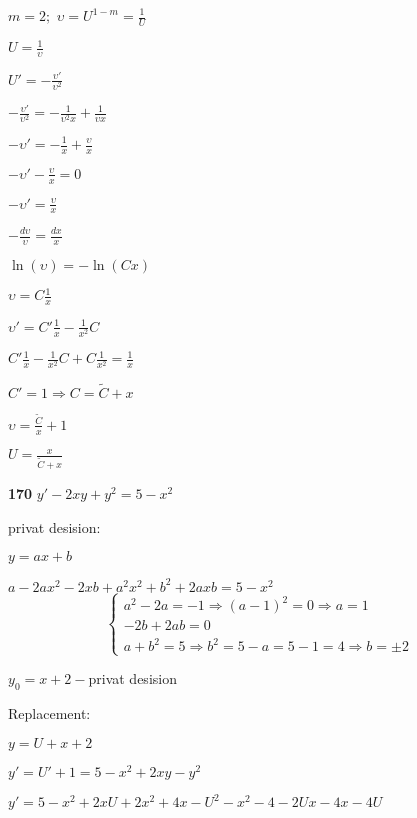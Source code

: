 \documentclass{article}
\begin{document}
\begin{left}
\begin{spacing}{2.2}
$m=2; $ $\displaystyle \upsilon=U^{1-m}=\frac{1}{U}$

$\displaystyle U=\frac{1}{\upsilon}$

$\displaystyle U'=-\frac{\upsilon'}{\upsilon^2}$

$\displaystyle -\frac{\upsilon'}{\upsilon^2}=-\frac{1}{\upsilon^2 x}+\frac{1}{\upsilon x}$

$\displaystyle -\upsilon'=-\frac{1}{x}+\frac{\upsilon}{x}$

$\displaystyle -\upsilon'-\frac{\upsilon}{x}=0$

$\displaystyle -\upsilon'=\frac{\upsilon}{x}$

$\displaystyle -\frac{d\upsilon}{\upsilon}=\frac{dx}{x}$

$\ln(\upsilon)=-\ln(Cx)$

$\displaystyle \upsilon=C\frac{1}{x}$

$\displaystyle \upsilon'=C'\frac{1}{x}-\frac{1}{x^2}C$

$\displaystyle C'\frac{1}{x}-\frac{1}{x^2}C+C\frac{1}{x^2}=\frac{1}{x}$

$C'=1 \Rightarrow C= \widetilde{C}+x$

$\displaystyle \upsilon=\frac{\widetilde{C}}{x}+1$

$\displaystyle U=\frac{x}{\widetilde{C}+x}$

\end{spacing}
\end{left}

\begin{flushleft}
{\bf 170 } $y'-2xy+y^2=5-x^2$


\end{flushleft}
privat desision:
\begin{left}
\begin{spacing}{1.5}
$y=ax+b$

$a-2ax^2-2xb+a^2x^2+b^2+2axb=5-x^2$
\begin{equation*}
 \begin{cases}
   a^2-2a=-1 \Rightarrow (a-1)^2=0 \Rightarrow a=1
   \\
   -2b+2ab=0
   \\
   a+b^2=5 \Rightarrow b^2=5-a=5-1=4 \Rightarrow b=\pm2
 \end{cases}
\end{equation*}

$y_0=x+2 - $privat desision
\end{spacing}
\end{left}
Replacement:
\begin{left} 
\begin{spacing}{1.8}
$y=U+x+2$

$y'=U'+1=5-x^2+2xy-y^2$

$y'=5-x^2+2xU+2x^2+4x-U^2-x^2-4-2Ux-4x-4U$

\end{spacing}
\end{left}
\end{document}
